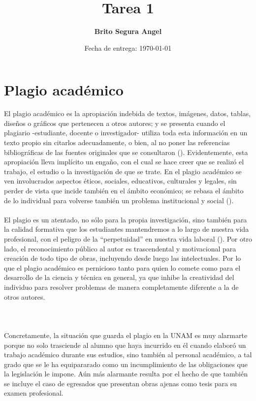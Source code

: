 \documentclass[a4paper]{article} %
\title{Tarea 1}
\author{\textbf{Brito Segura Angel}}
\date{Fecha de entrega: \today}
\begin{document}
    \pagestyle{fancy} %
    \maketitle %
    \section{Plagio académico}
    El plagio académico es la apropiación indebida de textos, imágenes, datos, tablas, diseños o gráficos que pertenecen a otros autores; y se presenta cuando el plagiario -estudiante, docente o investigador- utiliza toda esta información en un texto propio sin citarlos adecuadamente, o bien, al no poner las referencias bibliográficas de las fuentes originales que se consultaron (\cite{eticaacademica}). Evidentemente, esta apropiación lleva implícito un engaño, con el cual se hace creer que se realizó el trabajo, el estudio o la investigación de que se trate. En el plagio académico se ven involucrados aspectos éticos, sociales, educativos, culturales y legales, sin perder de vista que incide también en el ámbito económico; se rebasa el ámbito de lo individual para volverse también un problema institucional y social (\cite{plagioyetica}). \\ \\ 
    El plagio es un atentado, no sólo para la propia investigación, sino también para la calidad formativa que los estudiantes mantendremos a lo largo de nuestra vida profesional, con el peligro de la ``perpetuidad'' en nuestra vida laboral (\cite{presentacionplagio}). Por otro lado, el reconocimiento público al autor es trascendental y motivacional para creación de todo tipo de obras, incluyendo desde luego las intelectuales. Por lo que el plagio académico es pernicioso tanto para quien lo comete como para el desarrollo de la ciencia y técnica en general, ya que inhibe la creatividad del individuo para resolver problemas de manera completamente diferente a la de otros autores. \\ \\ \\ \\
    Concretamente, la situación que guarda el plagio en la UNAM es muy alarmarte porque no solo trasciende al alumno que haya incurrido en él cuando elaboró un trabajo académico durante sus estudios, sino también al personal académico, a tal grado que se le ha equipararado como un incumplimiento de las obligaciones que la legislación le impone. Aún más alarmante resulta por el hecho de que también se incluye el caso de egresados que presentan obras ajenas como tesis para su examen profesional. \\ \\
\end{document}
